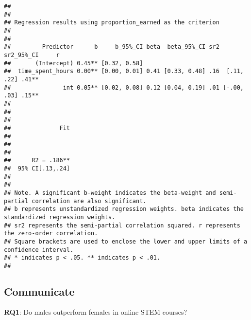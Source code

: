 \documentclass[
]{article}
\begin{document}
\begin{verbatim}
## 
## 
## Regression results using proportion_earned as the criterion
##  
## 
##         Predictor      b     b_95%_CI beta  beta_95%_CI sr2  sr2_95%_CI     r
##       (Intercept) 0.45** [0.32, 0.58]                                        
##  time_spent_hours 0.00** [0.00, 0.01] 0.41 [0.33, 0.48] .16  [.11, .22] .41**
##               int 0.05** [0.02, 0.08] 0.12 [0.04, 0.19] .01 [-.00, .03] .15**
##                                                                              
##                                                                              
##                                                                              
##              Fit
##                 
##                 
##                 
##      R2 = .186**
##  95% CI[.13,.24]
##                 
## 
## Note. A significant b-weight indicates the beta-weight and semi-partial correlation are also significant.
## b represents unstandardized regression weights. beta indicates the standardized regression weights. 
## sr2 represents the semi-partial correlation squared. r represents the zero-order correlation.
## Square brackets are used to enclose the lower and upper limits of a confidence interval.
## * indicates p < .05. ** indicates p < .01.
## 
\end{verbatim}

\hypertarget{communicate}{%
\subsection{Communicate}\label{communicate}}

\textbf{RQ1}: Do males outperform females in online STEM courses?
\end{document}
